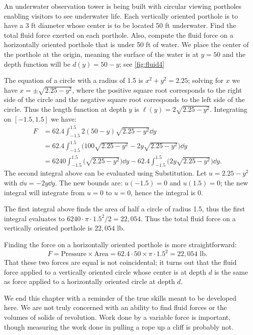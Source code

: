 \begin{example}\label{ex_fluid4}
An underwater observation tower is being built with circular viewing portholes enabling visitors to see underwater life. Each vertically oriented porthole is to have a 3 ft diameter whose center is to be located 50 ft underwater. Find the total fluid force exerted on each porthole. Also, compute the fluid force on a horizontally oriented porthole that is under 50 ft of water.
\solution
We place the center of the porthole at the origin, meaning the surface of the water is at $y=50$ and the depth function will be $d(y)=50-y$; see \autoref{fig:fluid4} 

The equation of a circle with a radius of 1.5 is $x^2+y^2=2.25$; solving for $x$ we have $x=\pm \sqrt{2.25-y^2}$, where the positive square root corresponds to the right side of the circle and the negative square root corresponds to the left side of the circle. Thus the length function at depth $y$ is $\ell(y) = 2\sqrt{2.25-y^2}$. Integrating on $[-1.5,1.5]$ we have:
\begin{align*}
	F
	&= 62.4\int_{-1.5}^{1.5} 2(50-y)\sqrt{2.25-y^2}\dd y \\
	&= 62.4\int_{-1.5}^{1.5} \bigl(100\sqrt{2.25-y^2} - 2y\sqrt{2.25-y^2}\bigr)\dd y \\
	&= 6240\int_{-1.5}^{1.5} \bigl(\sqrt{2.25-y^2}\bigr)\dd y - 62.4\int_{-1.5}^{1.5} \bigl(2y\sqrt{2.25-y^2}\bigr)\dd y.
\end{align*}			
The second integral above can be evaluated using Substitution. Let $u=2.25-y^2$ with $\dd u = -2y\dd y$. The new bounds are: $u(-1.5)=0$ and $u(1.5)=0$; the new integral will integrate from $u=0$ to $u=0$, hence the integral is 0.

The first integral above finds the area of half a circle of radius 1.5, thus the first integral evaluates to $6240\cdot\pi\cdot1.5^2/2 = 22,054$. Thus the total fluid force on a vertically oriented porthole is $22,054$ lb.

Finding the force on a horizontally oriented porthole is more straightforward:
\[
F = \text{Pressure}\times\text{Area} = 62.4\cdot50\times \pi\cdot1.5^2
 = 22,054\text{ lb}.
\]
That these two forces are equal is not coincidental; it turns out that the fluid force applied to a vertically oriented circle whose center is at depth $d$ is the same as force applied to a horizontally oriented circle at depth $d$.
\end{example}

We end this chapter with a reminder of the true skills meant to be developed here. We are not truly concerned with an ability to find fluid forces or the volumes of solids of revolution. Work done by a variable force is important, though measuring the work done in pulling a rope up a cliff is probably not.

